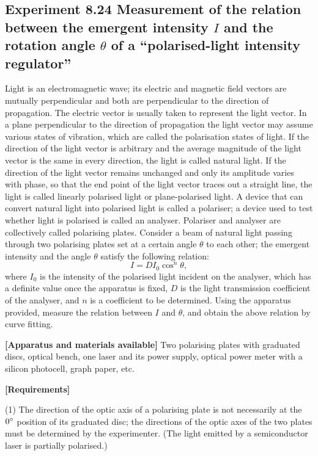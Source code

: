 \subsection*{Experiment 8.24 \quad Measurement of the relation between the emergent intensity $I$ and the rotation angle $\theta$ of a ``polarised-light intensity regulator''}

Light is an electromagnetic wave; its electric and magnetic field vectors are mutually perpendicular and both are perpendicular to the direction of propagation. The electric vector is usually taken to represent the light vector. In a plane perpendicular to the direction of propagation the light vector may assume various states of vibration, which are called the polarisation states of light. If the direction of the light vector is arbitrary and the average magnitude of the light vector is the same in every direction, the light is called natural light. If the direction of the light vector remains unchanged and only its amplitude varies with phase, so that the end point of the light vector traces out a straight line, the light is called linearly polarised light or plane-polarised light. A device that can convert natural light into polarised light is called a polariser; a device used to test whether light is polarised is called an analyser. Polariser and analyser are collectively called polarising plates. Consider a beam of natural light passing through two polarising plates set at a certain angle $\theta$ to each other; the emergent intensity and the angle $\theta$ satisfy the following relation:
\[
I=DI_0\cos^n\theta,
\]
where $I_0$ is the intensity of the polarised light incident on the analyser, which has a definite value once the apparatus is fixed, $D$ is the light transmission coefficient of the analyser, and $n$ is a coefficient to be determined. Using the apparatus provided, measure the relation between $I$ and $\theta$, and obtain the above relation by curve fitting.

\textbf{[Apparatus and materials available]} Two polarising plates with graduated discs, optical bench, one laser and its power supply, optical power meter with a silicon photocell, graph paper, etc.

\textbf{[Requirements]}

(1) The direction of the optic axis of a polarising plate is not necessarily at the $0^{\circ}$ position of its graduated disc; the directions of the optic axes of the two plates must be determined by the experimenter. (The light emitted by a semiconductor laser is partially polarised.)

